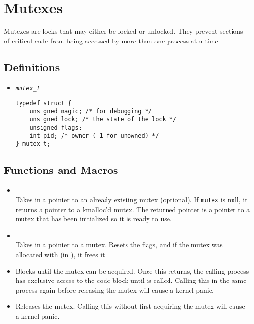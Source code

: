 \section{Mutexes}

Mutexes are locks that may either be locked or unlocked. They prevent sections of
critical code from being accessed by more than one process at a time.

\subsection{Definitions}
\begin{itemize}

\item \texttt{\textit{mutex\_t}} 
\begin{lstlisting}
typedef struct {
	unsigned magic; /* for debugging */
	unsigned lock; /* the state of the lock */
	unsigned flags;
	int pid; /* owner (-1 for unowned) */
} mutex_t;
\end{lstlisting}

\end{itemize}

\subsection{Functions and Macros}
\begin{itemize}
\item {} \\
Takes in a pointer to an already existing mutex (optional). If \texttt{mutex} is 
null, it returns a pointer to a kmalloc'd mutex. The returned pointer
is a pointer to a mutex that has been initialized so it is ready to use.

\item {} \\
Takes in a pointer to a mutex. Resets the flags, and if the mutex was allocated
with  (in ), it frees it.
\item {} 
Blocks until the mutex can be acquired. Once this returns,
the calling process has exclusive access to the code block until  is called.
Calling this in the same process again before releasing the mutex will cause a kernel panic.
\item {} 
Releases the mutex. Calling this without first acquiring the mutex will cause a kernel panic.
\end{itemize}
